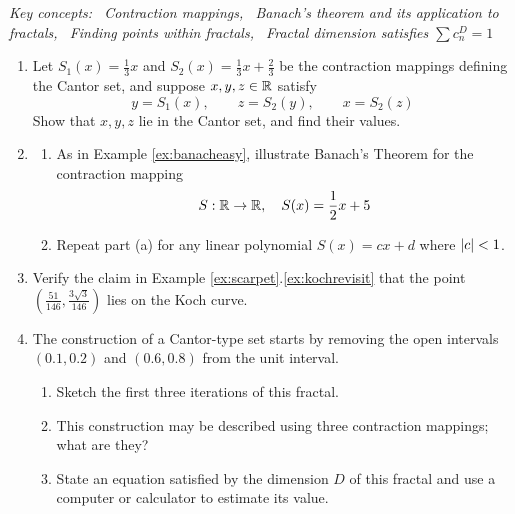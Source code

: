 \begin{exercises}
\hangindent\leftmargini\emph{Key concepts: \ Contraction mappings, \ Banach's theorem and its application to fractals, \ Finding points within fractals, \ Fractal dimension satisfies $\sum c_n^D=1$}

	  
	\begin{enumerate}
	  \item Let $S_1(x)=\frac 13 x$ and $S_2(x)=\frac 13x+\frac 23$ be the contraction mappings defining the Cantor set, and suppose $x,y,z\in\mathbb{R}$ satisfy
		\[
			y=S_1(x),\qquad z=S_2(y),\qquad x=S_2(z)
		\]
		Show that $x,y,z$ lie in the Cantor set, and find their values.
	  
	  
	 	\item\begin{enumerate}
	    \item As in Example \ref{ex:banacheasy}, illustrate Banach's Theorem for the contraction mapping
	    \[
	    	S:\mathbb{R}\to\mathbb{R},\quad S(x)=\frac 12x+5
	    \]
	    \item Repeat part (a) for any linear polynomial $S(x)=cx+d$ where $\left| c\right|<1$. 
	  \end{enumerate}
	  
	  
	  \item Verify the claim in Example \ref*{ex:scarpet}.\ref{ex:kochrevisit} that the point $\left(\frac{51}{146},\frac{3\sqrt 3}{146}\right)$ lies on the Koch curve.
	  
	  
	  \item The construction of a Cantor-type set starts by removing the open intervals $(0.1,0.2)$ and $(0.6,0.8)$ from the unit interval.
	  \begin{enumerate}
	    \item Sketch the first three iterations of this fractal.
	    \item This construction may be described using three contraction mappings; what are they?
	    \item State an equation satisfied by the dimension $D$ of this fractal and use a computer or calculator to estimate its value.
	  \end{enumerate}
	  
	  
	  \pagebreak[3]
	  

\end{enumerate}
\end{exercises}
